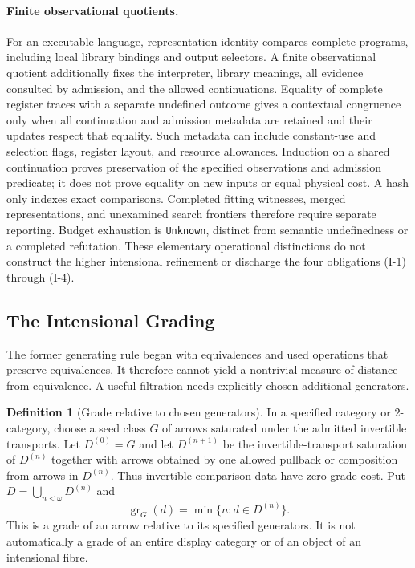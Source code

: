\documentclass[11pt]{article}
\theoremstyle{plain}
\theoremstyle{definition}
\newtheorem{definition}[theorem]{Definition}
\newcommand{\gr}{\operatorname{gr}}
\begin{document}
\paragraph{Finite observational quotients.}
For an executable language, representation identity compares complete programs,
including local library bindings and output selectors. A finite observational
quotient additionally fixes the interpreter, library meanings, all evidence
consulted by admission, and the allowed continuations. Equality of complete
register traces with a separate undefined outcome gives a contextual congruence
only when all continuation and admission metadata are retained and their
updates respect that equality. Such metadata can include constant-use and
selection flags, register layout, and resource allowances. Induction on a
shared continuation proves preservation of the specified observations and
admission predicate; it does not prove equality on new inputs or equal physical
cost. A hash only indexes exact comparisons. Completed fitting witnesses,
merged representations, and unexamined search frontiers therefore require
separate reporting. Budget exhaustion is \texttt{Unknown}, distinct from
semantic undefinedness or a completed refutation. These elementary operational
distinctions do not construct the higher intensional refinement or discharge
the four obligations (I-1) through (I-4).

\subsection{The Intensional Grading}\label{sec:intensional-grading}

The former generating rule began with equivalences and used operations that preserve equivalences. It therefore cannot yield a nontrivial measure of distance from equivalence. A useful filtration needs explicitly chosen additional generators.

\begin{definition}[Grade relative to chosen generators]\label{def:display-grade}
In a specified category or $2$-category, choose a seed class $G$ of arrows saturated under the admitted invertible transports. Let $D^{(0)}=G$ and let $D^{(n+1)}$ be the invertible-transport saturation of $D^{(n)}$ together with arrows obtained by one allowed pullback or composition from arrows in $D^{(n)}$. Thus invertible comparison data have zero grade cost. Put $D=\bigcup_{n<\omega}D^{(n)}$ and
\[
 \gr_G(d)=\min\{n:d\in D^{(n)}\}.
\]
This is a grade of an arrow relative to its specified generators. It is not automatically a grade of an entire display category or of an object of an intensional fibre.
\end{definition}
\end{document}
